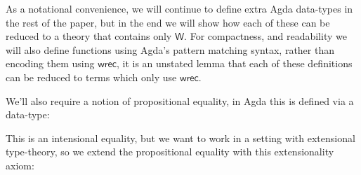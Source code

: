 \documentclass[a4paper]{article}
\newcommand{\Conid}[1]{\mathit{#1}}
\newcommand{\Varid}[1]{\mathit{#1}}
\def\resethooks{%
  \global\let\SaveRestoreHook\empty
  \global\let\ColumnHook\empty}
\newlength{\blanklineskip}
\newcommand{\hsindent}[1]{\quad}%
\let\hspre\empty
\let\hspost\empty
\renewcommand\Varid[1]{\mathord{\textsf{#1}}}
\let\Conid\Varid
\newcommand\Keyword[1]{\textsf{\textbf{#1}}}
\begin{document}
\noindent
As a notational convenience, we will continue to define extra Agda data-types
in the rest of the paper, but in the end we will show how each of these can
be reduced to a theory that contains only \ensuremath{\Conid{W}}. For compactness, and
readability we will also define functions using Agda's pattern matching
syntax, rather than encoding them using \ensuremath{\Varid{wrec}}, it is an unstated lemma that
each of these definitions can be reduced to terms which only use \ensuremath{\Varid{wrec}}.

We'll also require a notion of propositional equality, in Agda this is defined via a data-type:


\resethooks

This is an intensional equality, but we want to work in a setting with extensional type-theory, so we extend the propositional equality with this extensionality axiom:
\end{document}
